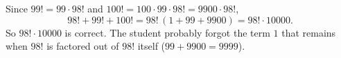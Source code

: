 Since $99!=99\cdot98!$ and $100!=100\cdot99\cdot98!=9900\cdot98!$,
\[
98!+99!+100!=98!\,(1+99+9900)=98!\cdot10000 .
\]
So $\boxed{98!\cdot10000}$ is correct. The student probably forgot the term $1$ that remains when $98!$ is factored out of $98!$ itself ($99+9900=9999$).
